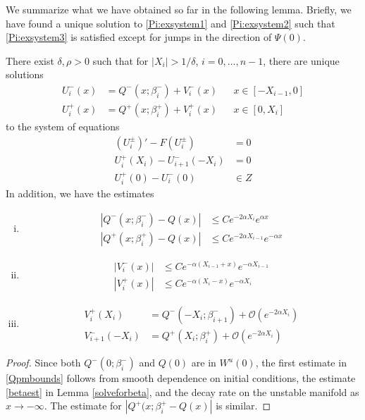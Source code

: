 \documentclass[thesis.tex]{subfiles}
\begin{document}
We summarize what we have obtained so far in the following lemma. Briefly, we have found a unique solution to \eqref{Pi:exsystem1} and \eqref{Pi:exsystem2} such that \eqref{Pi:exsystem3} is satisfied except for jumps in the direction of $\Psi(0)$.


\begin{lemma}\label{solvewithjumps}
There exist $\delta, \rho > 0$ such that for $|X_i| > 1/\delta$, $i = 0, \dots, n-1$, there are unique solutions
\begin{equation*}
\begin{aligned}
U_i^-(x) &= Q^-(x; \beta_i^-) + V_i^-(x) && x \in [-X_{i-1}, 0] \\
U_i^+(x) &= Q^+(x; \beta_i^+) + V_i^+(x) && x \in [0, X_i]
\end{aligned}
\end{equation*}
to the system of equations
\begin{equation}\label{systemwithjumpZ}
\begin{aligned}
(U_i^\pm)' - F(U_i^\pm) &= 0 \\
U_i^+(X_i) - U_{i+1}^-(-X_i) &= 0 \\
U_i^+(0) - U_i^-(0) &\in Z 
\end{aligned}
\end{equation}
In addition, we have the estimates
\begin{enumerate}[(i)]
\item 
\begin{equation}
\begin{aligned}\label{Qpmbounds}
|Q^-(x; \beta_i^-) - Q(x)| &\leq C e^{-2 \alpha X_i} e^{\alpha x} \\
|Q^+(x; \beta_i^+) - Q(x)| &\leq C e^{-2 \alpha X_{i-1}} e^{-\alpha x}
\end{aligned}
\end{equation}
\item
\begin{equation}\label{Vpmbounds}
\begin{aligned}
|V_i^-(x)| &\leq C e^{-\alpha(X_{i-1} + x)}e^{-\alpha X_{i-1}} \\
|V_i^+(x)| &\leq C e^{-\alpha(X_i - x)}e^{-\alpha X_i} 
\end{aligned}
\end{equation}
\item
\begin{equation}\label{VQpm}
\begin{aligned}
V_i^+(X_i) &= Q^-(-X_i; \beta_{i+1}^-) + \mathcal{O}(e^{-2 \alpha X_i}) \\
V_{i+1}^-(-X_i) &= Q^+(X_i; \beta_i^+) + \mathcal{O}(e^{-2 \alpha X_i})
\end{aligned}
\end{equation}
\end{enumerate}
\begin{proof}
Since both $Q^-(0; \beta_i^-)$ and $Q(0)$ are in $W^u(0)$, the first estimate in \eqref{Qpmbounds} follows from smooth dependence on initial conditions, the estimate \eqref{betaest} in Lemma \ref{solveforbeta},  and the decay rate on the unstable manifold as $x \rightarrow -\infty$. The estimate for $|Q^+(x; \beta_i^+ - Q(x)|$ is similar.


\end{proof}
\end{lemma}
\end{document}
